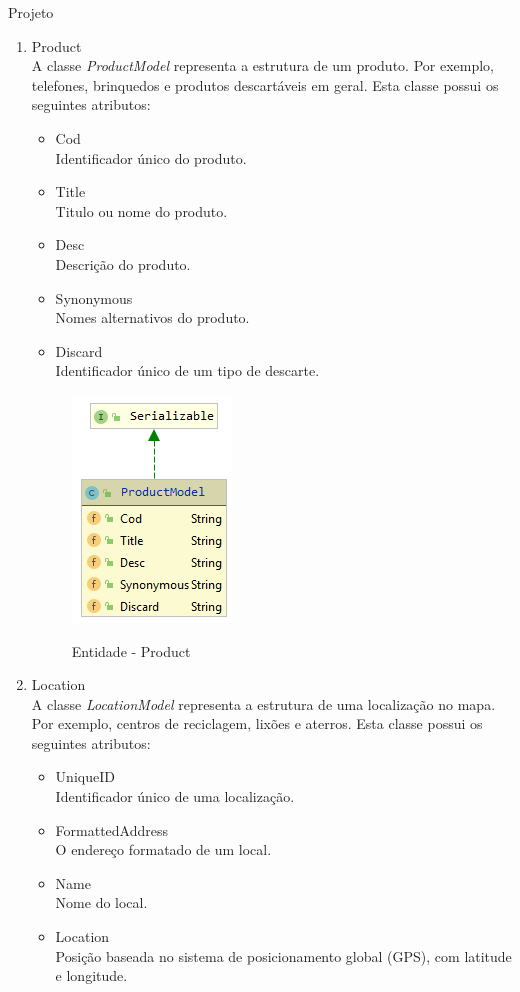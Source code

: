 \documentclass[
	12pt,				%
	openany,			%
	twoside,			%
	a4paper,			%
	english,			%
	french,				%
	spanish,			%
	brazil				%
	]{abntex2}
\begin{document}
\begin{chapter}{Projeto}
\begin{enumerate}
  \item{Product} \\ A classe \textit{ProductModel} representa a estrutura de um produto. Por exemplo, telefones, brinquedos e produtos descartáveis em geral. Esta classe possui os seguintes atributos:
  
     \begin{itemize}
  \item{Cod}\\ Identificador único do produto.
     \item{Title}\\ Titulo ou nome do produto.
       \item{Desc}\\ Descrição do produto.
         \item{Synonymous}\\ Nomes alternativos do produto.
                  \item{Discard}\\ Identificador único de um tipo de descarte.
\end{itemize}
  
\begin{figure}[h]
\centering
   \caption{Entidade - Product}
   \includegraphics[scale=1.0]{media/ProductModel.png}
     \label{fig:productModel}
\end{figure}


  \item{Location}  \\ A classe \textit{LocationModel} representa a estrutura de uma localização no mapa. Por exemplo, centros de reciclagem, lixões e aterros. Esta classe possui os seguintes atributos:
  
       \begin{itemize}
  \item{UniqueID}\\ Identificador único de uma localização.
     \item{FormattedAddress}\\ O endereço formatado de um local.
       \item{Name}\\ Nome do local.
         \item{Location}\\ Posição baseada no sistema de posicionamento global (GPS), com latitude e longitude.
\end{itemize}
  

\end{enumerate}
\end{chapter}
\end{document}

